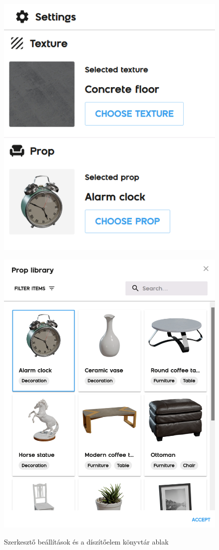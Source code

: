 \begin{figure}[H]
  \centering
  \begin{minipage}{.5\textwidth}
    \centering
    \includegraphics[width=.6\linewidth]{parts/developer-documentation/frontend/images/editorSettings.png}
    \label{fig:editorSettings}
  \end{minipage}%
  \begin{minipage}{.5\textwidth}
    \centering
    \includegraphics[width=.6\linewidth]{parts/developer-documentation/frontend/images/library.png}
    \label{fig:library}
  \end{minipage}
  \caption{Szerkesztő beállítások és a díszítőelem könyvtár ablak}
\end{figure}

